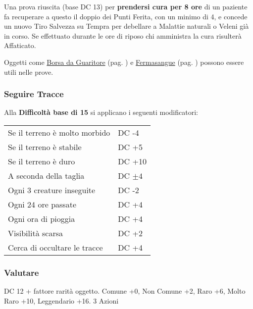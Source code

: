 \begin{multicols}{2}
Una prova riuscita (base DC 13) per \textbf{prendersi cura per 8 ore} di un paziente fa recuperare a questo il doppio dei Punti Ferita, con un minimo di 4, e concede un nuovo Tiro Salvezza su Tempra per debellare a Malattie naturali o Veleni già in corso.
Se effettuato durante le ore di riposo chi amministra la cura risulterà Affaticato.

Oggetti come \hyperlink{borsadaguaritore}{Borsa da Guaritore} (pag. \pageref{borsadaguaritore}) e \hyperlink{Fermasangue}{Fermasangue} (pag. \pageref{fermasangue}) possono essere utili nelle prove.

\titlespacing*{\subsubsection}{0pt}{0.5em}{0.5em}\subsubsection*{Seguire Tracce}\label{seguiretracce}

Alla \textbf{Difficoltà base di 15} si applicano i seguenti modificatori:

\medskip

\noindent\begin{tabularx}{0.5\textwidth}{ll}
	Se il terreno è molto morbido& DC -4\\
	Se il terreno è stabile& DC +5\\
	Se il terreno è duro& DC +10\\
	A seconda della taglia& DC $\pm4$\\
	Ogni 3 creature inseguite& DC -2\\
	Ogni 24 ore passate& DC +4\\
	Ogni ora di pioggia& DC +4\\
	Visibilità scarsa& DC +2\\
	Cerca di occultare le tracce& DC +4
\end{tabularx}

\titlespacing*{\subsubsection}{0pt}{0.5em}{0.5em}\subsubsection*{Valutare}\label{compvalutare}
DC 12 + fattore rarità oggetto. Comune +0, Non Comune +2, Raro +6, Molto Raro +10, Leggendario +16. 3 Azioni


\end{multicols}
